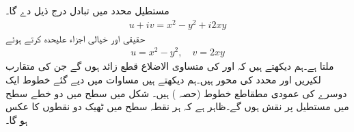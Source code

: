 مستطیل محدد میں تبادل  درج ذیل دے گا۔
\begin{align*}
u+iv=x^2-y^2+i2xy
\end{align*}
حقیقی اور خیالی اجزاء علیحدہ کرتے ہوئے 
\begin{align}\label{مساوات_نقش_مربع_ب}
u=x^2-y^2,\quad v=2xy
\end{align}
ملتا ہے۔ہم دیکھتے ہیں کہ  اور  کی  متساوی الاضلاع قطع زائد ہوں گے جن کی متقارب لکیریں  اور محدد کی محور ہیں۔ہم دیکھتے ہیں مساوات  میں دیے گئے  خطوط ایک دوسرے کی عمودی مطقاطع خطوط (حصہ ) ہیں۔ شکل  میں  سطح میں دو خطے  سطح میں مستطیل پر نقش ہوں گے۔ظاہر ہے کہ ہر نقطہ  سطح  میں ٹھیک  دو نقطوں کا عکس ہو گا۔

